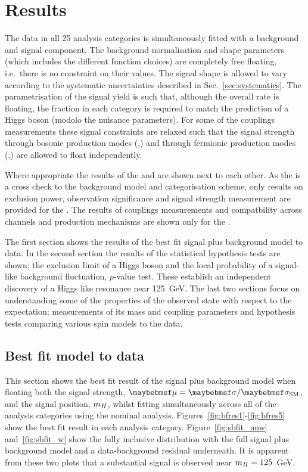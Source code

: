 \chapter{Results}
\label{chap:results}

The data in all 25 analysis categories is simultaneously fitted with a background and signal component. The background normalisation and shape parameters (which includes the different function choices) are completely free floating, i.e.~there is no constraint on their values. The signal shape is allowed to vary according to the systematic uncertainties described in Sec.~\ref{sec:systematics}. The parametrisation of the signal yield is such that, although the overall rate is floating, the fraction in each category is required to match the prediction of a \SM Higgs boson (modolo the nuisance parameters). For some of the couplings measurements these signal constraints are relaxed such that the signal strength through bosonic production modes (\VBF,\VH) and through fermionic production modes (\ggH,\ttH) are allowed to float independently. 

Where appropriate the results of the \MFM and \SMVA are shown next to each other. As the \SMVA is a cross check to the background model and categorisation scheme, only results on exclusion power, observation significance and signal strength measurement are provided for the \SMVA. The results of couplings measurements and compatbility across channels and production mechanisms are shown only for the \MFM.

The first section shows the results of the best fit signal plus background model to data. In the second section the results of the statistical hypothesis tests are shown; the exclusion limit of a \SM Higgs boson and the local probability of a signal-like background fluctuation, $p$-value test. These establish an independent discovery of a Higgs like resonance near 125~GeV. The last two sections focus on understanding some of the properties of the observed state with respect to the \SM expectation; measurements of its mass and coupling parameters and hypothesis tests comparing various spin models to the data.

\section{Best fit model to data}

This section shows the best fit result of the signal plus background model when floating both the signal strength, $\mu=\musm$, and the signal position, $m_{H}$, whilst fitting simultaneously across all of the analysis categories using the nominal \MFM analysis. Figures~\ref{fig:bfres1}-\ref{fig:bfres5} show the best fit result in each analysis category. Figure~\ref{fig:sbfit_unw} and~\ref{fig:sbfit_w} show the fully inclusive distribution with the full signal plus background model and a data-background residual underneath. It is apparent from these two plots that a substantial signal is observed near $m_{H}=125$~GeV.

